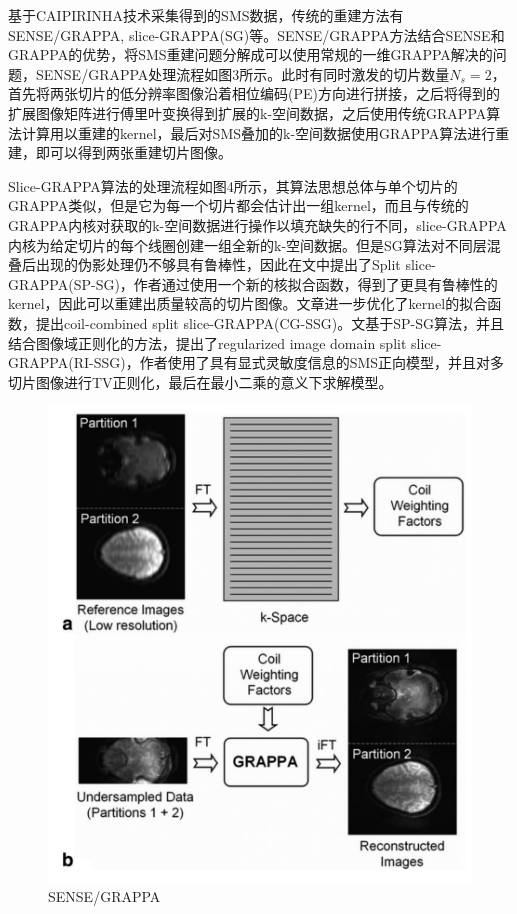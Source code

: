 \documentclass[UTF8]{article}
\begin{document}
\par 基于CAIPIRINHA技术采集得到的SMS数据，传统的重建方法有SENSE/GRAPPA\cite{blaimer2006accelerated}, slice-GRAPPA(SG)\cite{setsompop2012blipped}等。SENSE/GRAPPA方法结合SENSE和GRAPPA的优势，将SMS重建问题分解成可以使用常规的一维GRAPPA解决的问题，SENSE/GRAPPA处理流程如图3所示。此时有同时激发的切片数量$N_s=2$，首先将两张切片的低分辨率图像沿着相位编码(PE)方向进行拼接，之后将得到的扩展图像矩阵进行傅里叶变换得到扩展的k-空间数据，之后使用传统GRAPPA算法计算用以重建的kernel，最后对SMS叠加的k-空间数据使用GRAPPA算法进行重建，即可以得到两张重建切片图像。
\par Slice-GRAPPA算法的处理流程如图4所示，其算法思想总体与单个切片的GRAPPA类似，但是它为每一个切片都会估计出一组kernel，而且与传统的GRAPPA内核对获取的k-空间数据进行操作以填充缺失的行不同，slice-GRAPPA内核为给定切片的每个线圈创建一组全新的k-空间数据。但是SG算法对不同层混叠后出现的伪影处理仍不够具有鲁棒性，因此在文\cite{cauley2014interslice}中提出了Split slice-GRAPPA(SP-SG)，作者通过使用一个新的核拟合函数，得到了更具有鲁棒性的kernel，因此可以重建出质量较高的切片图像。文章\cite{hashemizadehkolowri2020coil}进一步优化了kernel的拟合函数，提出coil-combined split slice-GRAPPA(CG-SSG)。文\cite{hashemizadehkolowri2021simultaneous}基于SP-SG算法，并且结合图像域正则化的方法，提出了regularized image domain split slice-GRAPPA(RI-SSG)，作者使用了具有显式灵敏度信息的SMS正向模型，并且对多切片图像进行TV正则化，最后在最小二乘的意义下求解模型。
\begin{figure}[ht]
	\centering
	\includegraphics[scale=0.7]{./image/3.jpg}
	\caption{SENSE/GRAPPA}
\end{figure}
\end{document}
